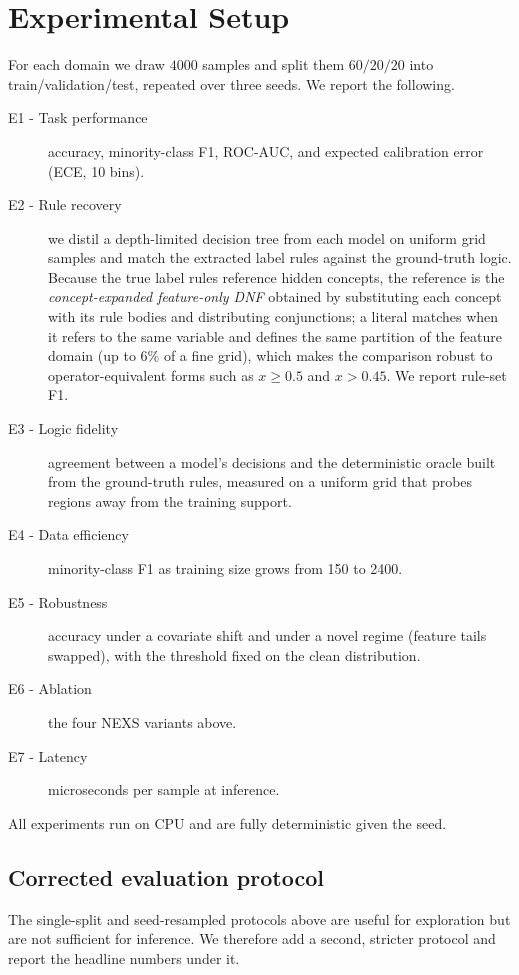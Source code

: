 \documentclass[11pt]{article}
\newcommand{\nexs}{\textsc{NEXS}}
\begin{document}
\section{Experimental Setup}
\label{sec:exp}
For each domain we draw $4000$ samples and split them $60/20/20$ into
train/validation/test, repeated over three seeds. We report the following.
\begin{description}
  \item[E1 - Task performance] accuracy, minority-class F1, ROC-AUC, and expected
  calibration error (ECE, 10 bins).
  \item[E2 - Rule recovery] we distil a depth-limited decision tree from each
  model on uniform grid samples and match the extracted label rules against the
  ground-truth logic. Because the true label rules reference hidden concepts, the
  reference is the \emph{concept-expanded feature-only DNF} obtained by
  substituting each concept with its rule bodies and distributing conjunctions; a
  literal matches when it refers to the same variable and defines the same
  partition of the feature domain (up to $6\%$ of a fine grid), which makes the
  comparison robust to operator-equivalent forms such as $x\ge 0.5$ and $x>0.45$.
  We report rule-set F1.
  \item[E3 - Logic fidelity] agreement between a model's decisions and the
  deterministic oracle built from the ground-truth rules, measured on a uniform
  grid that probes regions away from the training support.
  \item[E4 - Data efficiency] minority-class F1 as training size grows from 150
  to 2400.
  \item[E5 - Robustness] accuracy under a covariate shift and under a novel regime
  (feature tails swapped), with the threshold fixed on the clean distribution.
  \item[E6 - Ablation] the four \nexs{} variants above.
  \item[E7 - Latency] microseconds per sample at inference.
\end{description}
All experiments run on CPU and are fully deterministic given the seed.

\subsection{Corrected evaluation protocol}
\label{sec:protocol}
The single-split and seed-resampled protocols above are useful for exploration but
are not sufficient for inference. We therefore add a second, stricter protocol and
report the headline numbers under it.
\end{document}
